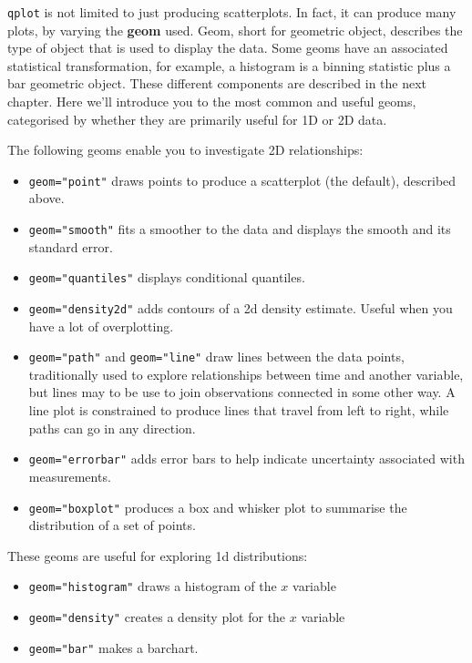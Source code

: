 {\tt qplot} is not limited to just producing scatterplots.  In fact, it can produce many plots, by varying the {\bf geom} used. Geom, short for geometric object, describes the type of object that is used to display the data.  Some geoms have an associated statistical transformation, for example, a histogram is a binning statistic plus a bar geometric object.  These different components are described in the next chapter.  Here we'll introduce you to the most common and useful geoms, categorised by whether they are primarily useful for 1D or 2D data.

The following geoms enable you to investigate 2D relationships:

\begin{itemize}
	\item {\tt geom="point"} draws points to produce a scatterplot (the default), described above.
	\item {\tt geom="smooth"} fits a smoother to the data and displays the smooth and its standard error.
	\item {\tt geom="quantiles"} displays conditional quantiles.
	\item {\tt geom="density2d"} adds contours of a 2d density estimate.  Useful when you have a lot of overplotting.
	\item {\tt geom="path"} and {\tt geom="line"} draw lines between the data points, traditionally used to explore relationships between time and another variable, but lines may to be use to join observations connected in some other way.  A line plot is constrained to produce lines that travel from left to right, while paths can go in any direction.
	\item {\tt geom="errorbar"} adds error bars to help indicate uncertainty associated with measurements.
	\item {\tt geom="boxplot"} produces a box and whisker plot to summarise the distribution of a set of points.
\end{itemize}

These geoms are useful for exploring 1d distributions:

\begin{itemize}
	\item {\tt geom="histogram"} draws a histogram of the $x$ variable
	\item {\tt geom="density"} creates a density plot for the $x$ variable
	\item {\tt geom="bar"} makes a barchart.
\end{itemize}

